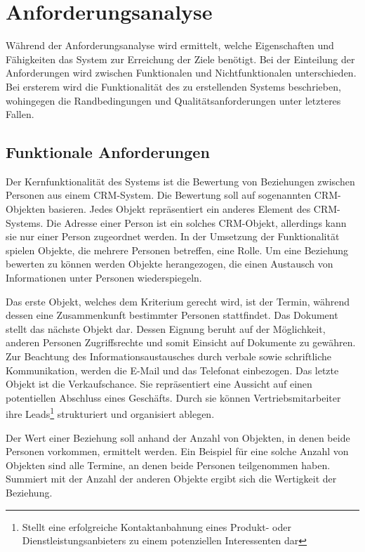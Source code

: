 \section{Anforderungsanalyse}
\label{ch:Systemanalyse:sec:Anforderungsanalyse}

Während der Anforderungsanalyse wird ermittelt, welche Eigenschaften und Fähigkeiten das System zur Erreichung der Ziele benötigt. Bei der Einteilung der Anforderungen wird zwischen Funktionalen und Nichtfunktionalen unterschieden. Bei ersterem wird die Funktionalität des zu erstellenden Systems beschrieben, wohingegen die Randbedingungen und Qualitätsanforderungen unter letzteres Fallen. 

\subsection{Funktionale Anforderungen}

Der Kernfunktionalität des Systems ist die Bewertung von Beziehungen zwischen Personen aus einem CRM-System. Die Bewertung soll auf sogenannten CRM-Objekten basieren. Jedes Objekt repräsentiert ein anderes Element des CRM-Systems. Die Adresse einer Person ist ein solches CRM-Objekt, allerdings kann sie nur einer Person zugeordnet werden. In der Umsetzung der Funktionalität spielen Objekte, die mehrere Personen betreffen, eine Rolle. Um eine Beziehung bewerten zu können werden Objekte herangezogen, die einen Austausch von Informationen unter Personen wiederspiegeln.
 
Das erste Objekt, welches dem Kriterium gerecht wird, ist der Termin, während dessen eine Zusammenkunft bestimmter Personen stattfindet. Das Dokument stellt das nächste Objekt dar. Dessen Eignung beruht auf der Möglichkeit, anderen Personen Zugriffsrechte und somit Einsicht auf Dokumente zu gewähren. Zur Beachtung des Informationsaustausches durch verbale sowie schriftliche Kommunikation, werden die E-Mail und das Telefonat einbezogen. Das letzte Objekt ist die Verkaufschance. Sie repräsentiert eine Aussicht auf einen potentiellen Abschluss eines Geschäfts. Durch sie können Vertriebsmitarbeiter ihre Leads\footnote{Stellt eine erfolgreiche Kontaktanbahnung eines Produkt- oder Dienstleistungsanbieters zu einem potenziellen Interessenten dar} strukturiert und organisiert ablegen.

Der Wert einer Beziehung soll anhand der Anzahl von Objekten, in denen beide Personen vorkommen, ermittelt werden. Ein Beispiel für eine solche Anzahl von Objekten sind alle Termine, an denen beide Personen teilgenommen haben. Summiert mit der Anzahl der anderen Objekte ergibt sich die Wertigkeit der Beziehung. 

